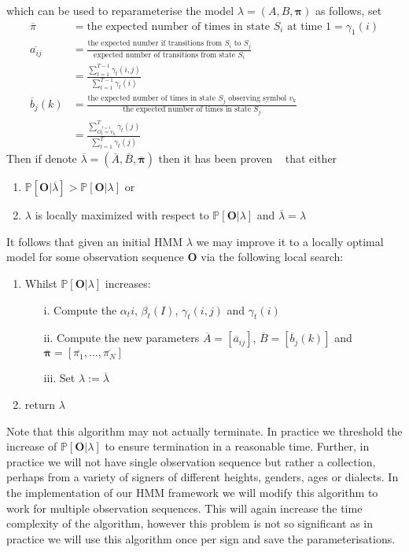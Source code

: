 which can be used to reparameterise the model $\lambda = (A,B,\bm{\pi})$ as follows, set
\begin{align*}
\overline{\pi} &= \text{the expected number of times in state $S_i$ at time $1$} = \gamma_1(i) \\
\overline{a_{ij}} &= \frac{\text{the expected number if transitions from $S_i$ to $S_j$}}{\text{expected number of transitions from state $S_i$}} \\ 
				&= \frac{\sum_{t=1}^{T-1} \gamma_t(i,j)}{\sum_{t=1}^{T-1} \gamma_t(i)} \\
\overline{b}_j(k) &= \frac{\text{the expected number of times in state $S_j$ observing symbol $v_k$}}{\text{the expected number of times in state $S_j$}} \\
				&=\frac{\sum_{\stackrel{t=1}{O_t=v_k}}^{T}\gamma_t(j)}{\sum_{t=1}^T \gamma_t(j)}
\end{align*}
Then if denote $\overline{\lambda} = (\overline{A},\overline{B},\overline{\bm{\pi}})$ then it has been proven ~\citep{levinson1983introduction, baum1968growth} that either
\begin{enumerate}
\item $\mathbb{P}[\bm{O}|\overline{\lambda}] > \mathbb{P}[\bm{O}|\lambda]$ or
\item $\lambda$ is locally maximized with respect to $\mathbb{P}[\bm{O}|\lambda]$ and $\overline{\lambda} = \lambda$
\end{enumerate}
It follows that given an initial HMM $\lambda$ we may improve it to a locally optimal model for some observation sequence $\bm{O}$ via the following local search:
\begin{enumerate}
\item Whilst $\mathbb{P}[\bm{O}|\lambda]$ increases:
	\begin{enumerate}
		\item[i.] Compute the $\alpha_t{i}$, $\beta_t(I)$, $\gamma_t(i,j)$ and $\gamma_t(i)$
		\item[ii.] Compute the new parameters $\overline{A} = [\overline{a}_{ij}]$, $\overline{B} = [\overline{b}_j(k)]$ and $\overline{\bm{\pi}} = [\overline{\pi_1}, \dots, \overline{\pi_N}]$
		\item[iii.] Set $\lambda := \overline{\lambda}$
	\end{enumerate}
\item return $\lambda$
\end{enumerate}
Note that this algorithm may not actually terminate. In practice we threshold the increase of $\mathbb{P}[\bm{O}|\lambda]$ to ensure termination in a reasonable time. Further, in practice we will not have single observation sequence but rather a collection, perhaps from a variety of signers of different heights, genders, ages or dialects. In the implementation of our HMM framework we will modify this algorithm to work for multiple observation sequences. This will again increase the time complexity of the algorithm, however this problem is not so significant as in practice we will use this algorithm once per sign and save the parameterisations.

